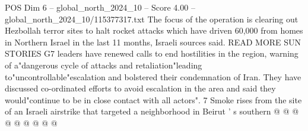 \begin{textsample}{POS Dim 6 – global\_north\_2024\_10 – Score 4.00 – global\_north\_2024\_10/115377317.txt}
The focus of the operation is clearing out Hezbollah terror sites to halt rocket attacks which have driven 60,000 from homes in Northern Israel in the last 11 months, Israeli sources said.
READ MORE SUN STORIES G7 leaders have renewed calls to end hostilities in the region, warning of a"dangerous cycle of attacks and retaliation"leading to"uncontrollable"escalation and bolstered their condemnation of Iran.
They have discussed co-ordinated efforts to avoid escalation in the area and said they would"continue to be in close contact with all actors". 7 Smoke rises from the site of an Israeli airstrike that targeted a neighborhood in Beirut ' s southern @ @ @ @ @ @ @ @ @

\end{textsample}
